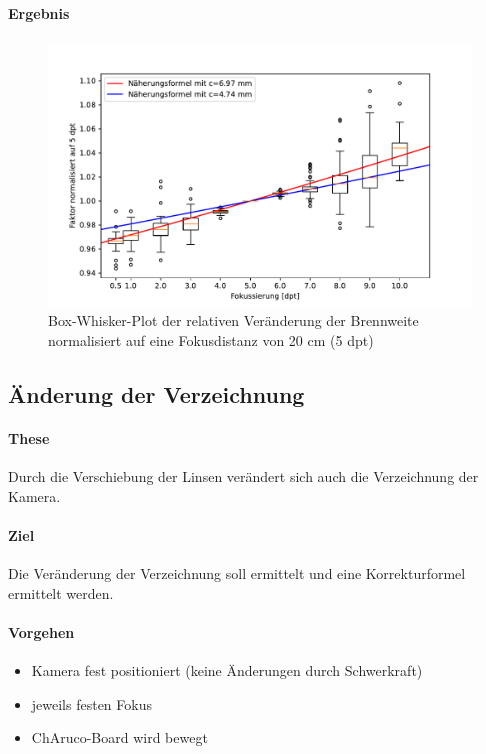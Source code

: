 \documentclass[./00PhotoBox.tex]{subfiles}
\begin{document}
\paragraph{Ergebnis}


\begin{figure}
    \centering
    \includegraphics[width=1\textwidth]{./img/fokus_faktor_diagramm_box.pdf}
    \centering
    \caption{Box-Whisker-Plot der relativen Veränderung der Brennweite normalisiert auf eine Fokusdistanz von 20 cm (5 dpt)} %
    \label{img:fokus_faktor} %
\end{figure}



\subsection{Änderung der Verzeichnung}

\paragraph{These}
Durch die Verschiebung der Linsen verändert sich auch die Verzeichnung der Kamera.

\paragraph{Ziel}
Die Veränderung der Verzeichnung soll ermittelt und eine Korrekturformel ermittelt werden.

\paragraph{Vorgehen}

\begin{itemize}
    \item Kamera fest positioniert (keine Änderungen durch Schwerkraft)
    \item jeweils festen Fokus
    \item ChAruco-Board wird bewegt
\end{itemize}
\end{document}

